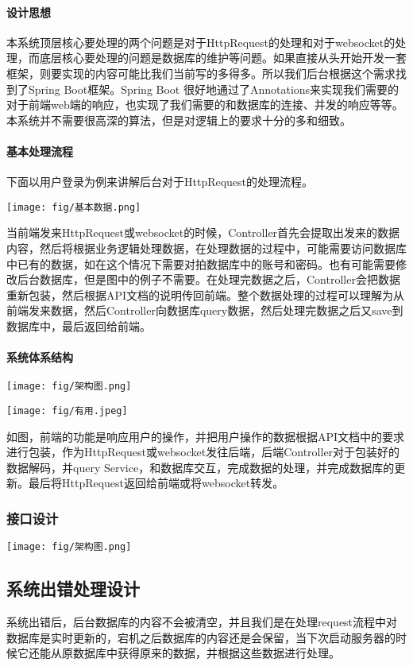 \documentclass{article}
\begin{document}
				\paragraph{设计思想}
					本系统顶层核心要处理的两个问题是对于HttpRequest的处理和对于websocket的处理，而底层核心要处理的问题是数据库的维护等问题。如果直接从头开始开发一套框架，则要实现的内容可能比我们当前写的多得多。所以我们后台根据这个需求找到了Spring Boot框架。Spring Boot 很好地通过了Annotations来实现我们需要的对于前端web端的响应，也实现了我们需要的和数据库的连接、并发的响应等等。本系统并不需要很高深的算法，但是对逻辑上的要求十分的多和细致。
				\paragraph{基本处理流程}
                    下面以用户登录为例来讲解后台对于HttpRequest的处理流程。

                    \texttt{[image: fig/基本数据.png]}

                    当前端发来HttpRequest或websocket的时候，Controller首先会提取出发来的数据内容，然后将根据业务逻辑处理数据，在处理数据的过程中，可能需要访问数据库中已有的数据，如在这个情况下需要对拍数据库中的账号和密码。也有可能需要修改后台数据库，但是图中的例子不需要。在处理完数据之后，Controller会把数据重新包装，然后根据API文档的说明传回前端。整个数据处理的过程可以理解为从前端发来数据，然后Controller向数据库query数据，然后处理完数据之后又save到数据库中，最后返回给前端。
                \paragraph{系统体系结构}
                    \texttt{[image: fig/架构图.png]}

                    \texttt{[image: fig/有用.jpeg]}

                    如图，前端的功能是响应用户的操作，并把用户操作的数据根据API文档中的要求进行包装，作为HttpRequest或websocket发往后端，后端Controller对于包装好的数据解码，并query Service，和数据库交互，完成数据的处理，并完成数据库的更新。最后将HttpRequest返回给前端或将websocket转发。
            \subsubsection{接口设计}
                \texttt{[image: fig/架构图.png]}
		\subsection{系统出错处理设计}
			系统出错后，后台数据库的内容不会被清空，并且我们是在处理request流程中对数据库是实时更新的，宕机之后数据库的内容还是会保留，当下次启动服务器的时候它还能从原数据库中获得原来的数据，并根据这些数据进行处理。
\end{document}

